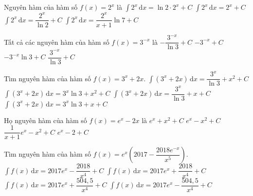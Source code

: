 \begin{ex}%
	Nguyên hàm của hàm số  $f(x)=2^x$ là
	\choice
	{$\displaystyle\int 2^x \mathrm{\,d}x=\ln 2\cdot 2^x+C$}
	{$\displaystyle\int 2^x \mathrm{\,d}x=2^x+C$}
	{\True $\displaystyle\int 2^x \mathrm{\,d}x=\dfrac{2^{x}}{\ln 2}+C$}
	{$\displaystyle\int 2^x \mathrm{\,d}x=\dfrac{2^x}{x+1}\ln 7+C$}
\end{ex}

\begin{ex}%
	Tất cả các nguyên hàm của hàm số  $f(x)=3^{-x}$ là
	\choice
	{\True $-\dfrac{3^{-x}}{\ln 3}+C$}
	{$-3^{-x}+C$}
	{$-3^{-x}\ln 3+C$}
	{$\dfrac{3^{-x}}{\ln 3}+C$}
\end{ex}

\begin{ex}%
	Tìm nguyên hàm của hàm số $f(x)=3^x+2x$.
	\choice
	{\True $\displaystyle\int (3^x+2x) \mathrm{\,d}x=\dfrac{3^x}{\ln 3}+x^2+C$}
	{$\displaystyle\int (3^x+2x) \mathrm{\,d}x=3^x\ln3+x^2+C$}
	{$\displaystyle\int (3^x+2x) \mathrm{\,d}x=\dfrac{3^x}{\ln 3}+x+C$}
	{$\displaystyle\int (3^x+2x) \mathrm{\,d}x=3^x\ln3+x+C$}
\end{ex}

\begin{ex}%
	Họ nguyên hàm của hàm số $f(x)=e^x-2x$ là
	\choice
	{$e^x+x^2+C$}
	{\True $e^x-x^2+C$}
	{$\dfrac{1}{x+1}e^x-x^2+C$}
	{$e^x-2+C$}
\end{ex}

\begin{ex}%
	Tìm nguyên hàm của hàm số $f(x)=e^x\left(2017-\dfrac{2018e^{-x}}{x^5}\right) $.
	\choice
	{$\displaystyle\int f(x) \mathrm{\,d}x=2017e^x-\dfrac{2018}{x^4}+C$}
	{$\displaystyle\int f(x) \mathrm{\,d}x=2017e^x+\dfrac{2018}{x^4}+C$}
	{\True $\displaystyle\int f(x) \mathrm{\,d}x=2017e^x+\dfrac{504{,}5}{x^4}+C$}
	{$\displaystyle\int f(x) \mathrm{\,d}x=2017e^x-\dfrac{504{,}5}{x^4}+C$}
\end{ex}

